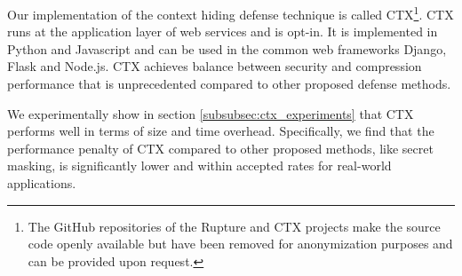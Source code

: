 Our implementation of the context hiding defense technique is called
CTX\footnote[1]{The GitHub repositories of the Rupture and CTX projects make the
source code openly available but have been removed for anonymization purposes
and can be provided upon request.}. CTX runs at the application layer of web
services and is opt-in. It is implemented in Python and Javascript and can be
used in the common web frameworks Django, Flask and Node.js. CTX achieves
balance between security and compression performance that is unprecedented
compared to other proposed defense methods.

We experimentally show in section \ref{subsubsec:ctx_experiments} that CTX
performs well in terms of size and time overhead. Specifically, we find that the
performance penalty of CTX compared to other proposed methods, like secret
masking, is significantly lower and within accepted rates for real-world
applications.
